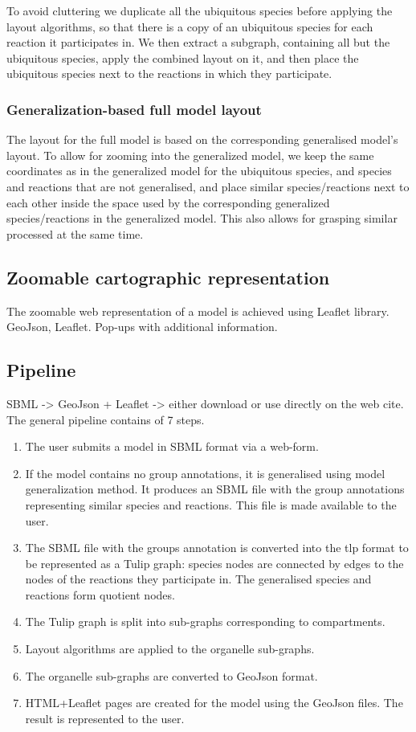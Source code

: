 \documentclass{bmcart}
\begin{document}
To avoid cluttering we duplicate all the ubiquitous species before applying the layout algorithms, so that there is a copy of an ubiquitous species for each reaction it participates in. We then extract a subgraph, containing all but the ubiquitous species, apply the combined layout on it, and then place the ubiquitous species next to the reactions in which they participate.

\subsubsection*{Generalization-based full model layout}
The layout for the full model is based on the corresponding generalised model's layout. To allow for zooming into the generalized model, we keep the same coordinates as in the generalized model for the ubiquitous species, and species and reactions that are not generalised, and place similar species/reactions next to each other inside the space used by the corresponding generalized species/reactions in the generalized model. This also allows for grasping similar processed at the same time. 
 
\subsection*{Zoomable cartographic representation}

The zoomable web representation of a model is achieved using Leaflet library.
GeoJson, Leaflet. Pop-ups with additional information.
 
\subsection*{Pipeline}
SBML -> GeoJson + Leaflet -> either download or use directly on the web cite.
The general pipeline contains of 7 steps.
\begin{enumerate}
\item The user submits a model in SBML format via a web-form.
\item If the model contains no group annotations, it is generalised using model generalization method. It produces an SBML file with the group annotations representing similar species and reactions. This file is made available to the user.
\item The SBML file with the groups annotation is converted into the tlp format to be represented as a Tulip graph: species nodes are connected by edges to the nodes of the reactions they participate in. The generalised species and reactions form quotient nodes.
\item The Tulip graph is split into sub-graphs corresponding to compartments.
\item Layout algorithms are applied to the organelle sub-graphs.
\item The organelle sub-graphs are converted to GeoJson format.
\item HTML+Leaflet pages are created for the model using the GeoJson files. The result is represented to the user.
\end{enumerate}
\end{document}
